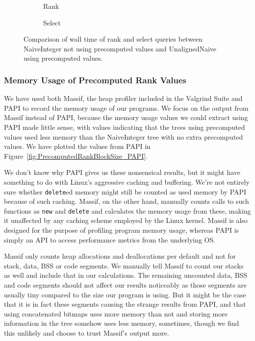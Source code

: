 \begin{figure}\tiny
	\begin{subfigure}{0.48\textwidth}
		
		\caption{Rank}
		\label{fig:PrecomputedRankBlockSize_vsNaiveInteger_Rank}
	\end{subfigure}
	\hfill
	\begin{subfigure}{0.48\textwidth}
		
		\caption{Select}
		\label{fig:PrecomputedRankBlockSize_vsNaiveInteger_Select}
	\end{subfigure}
	\caption{Comparison of wall time of rank and select queries between NaiveInteger not using precomputed values and UnalignedNaive using precomputed values.}
	\label{fig:PrecomputedRankBlockSize_vsNaiveInteger}
\end{figure}

\restoregeometry




\subsubsection{Memory Usage of Precomputed Rank Values}
We have used both Massif, the heap profiler included in the Valgrind Suite and PAPI to record the memory usage of our programs.
We focus on the output from Massif instead of PAPI, because the memory usage values we could extract using PAPI made little sense, with values indicating that the trees using precomputed values used less memory than the NaiveInteger tree with no extra precomputed values.
We have plotted the values from PAPI in Figure~\ref{fig:PrecomputedRankBlockSize_PAPI}.

We don't know why PAPI gives us these nonsensical results, but it might have something to do with Linux's aggressive caching and buffering.
We're not entirely sure whether \texttt{delete}ed memory might still be counted as used memory by PAPI because of such caching.
Massif, on the other hand, manually counts calls to such functions as \texttt{new} and \texttt{delete} and calculates the memory usage from these, making it unaffected by any caching scheme employed by the Linux kernel.
Massif is also designed for the purpose of profiling program memory usage, whereas PAPI is simply an API to access performance metrics from the underlying OS.

Massif only counts heap allocations and deallocations per default and not for stack, data, BSS or code segments.
We manually tell Massif to count our stacks as well and include that in our calculations.
The remaining uncounted data, BSS and code segments should not affect our results noticeably as those segments are usually tiny compared to the size our program is using.
But it might be the case that it is in fact these segments causing the strange results from PAPI, and that using concatenated bitmaps uses more memory than not and storing more information in the tree somehow uses less memory, sometimes, though we find this unlikely and choose to trust Massif's output more.

